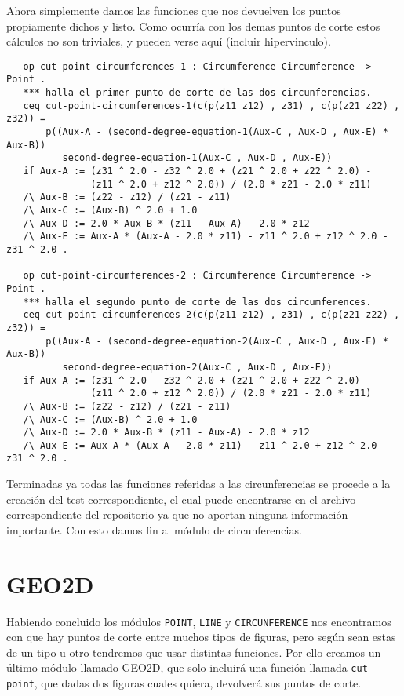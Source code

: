 Ahora simplemente damos las funciones que nos devuelven los puntos propiamente dichos y listo. Como ocurría con los demas puntos de corte estos cálculos no son triviales, y pueden verse aquí (incluir hipervinculo). 
{\codesize
\begin{verbatim}
   op cut-point-circumferences-1 : Circumference Circumference -> Point .
   *** halla el primer punto de corte de las dos circunferencias.
   ceq cut-point-circumferences-1(c(p(z11 z12) , z31) , c(p(z21 z22) , z32)) = 
       p((Aux-A - (second-degree-equation-1(Aux-C , Aux-D , Aux-E) * Aux-B))  
          second-degree-equation-1(Aux-C , Aux-D , Aux-E))
   if Aux-A := (z31 ^ 2.0 - z32 ^ 2.0 + (z21 ^ 2.0 + z22 ^ 2.0) - 
               (z11 ^ 2.0 + z12 ^ 2.0)) / (2.0 * z21 - 2.0 * z11) 
   /\ Aux-B := (z22 - z12) / (z21 - z11) 
   /\ Aux-C := (Aux-B) ^ 2.0 + 1.0
   /\ Aux-D := 2.0 * Aux-B * (z11 - Aux-A) - 2.0 * z12
   /\ Aux-E := Aux-A * (Aux-A - 2.0 * z11) - z11 ^ 2.0 + z12 ^ 2.0 - z31 ^ 2.0 .

   op cut-point-circumferences-2 : Circumference Circumference -> Point .
   *** halla el segundo punto de corte de las dos circumferences.
   ceq cut-point-circumferences-2(c(p(z11 z12) , z31) , c(p(z21 z22) , z32)) = 
       p((Aux-A - (second-degree-equation-2(Aux-C , Aux-D , Aux-E) * Aux-B))  
          second-degree-equation-2(Aux-C , Aux-D , Aux-E))
   if Aux-A := (z31 ^ 2.0 - z32 ^ 2.0 + (z21 ^ 2.0 + z22 ^ 2.0) -
               (z11 ^ 2.0 + z12 ^ 2.0)) / (2.0 * z21 - 2.0 * z11) 
   /\ Aux-B := (z22 - z12) / (z21 - z11) 
   /\ Aux-C := (Aux-B) ^ 2.0 + 1.0
   /\ Aux-D := 2.0 * Aux-B * (z11 - Aux-A) - 2.0 * z12
   /\ Aux-E := Aux-A * (Aux-A - 2.0 * z11) - z11 ^ 2.0 + z12 ^ 2.0 - z31 ^ 2.0 .
\end{verbatim}
}

Terminadas ya todas las funciones referidas a las circunferencias se procede a la creación del test correspondiente, el cual puede encontrarse en el archivo correspondiente del repositorio ya que no aportan ninguna información importante. Con esto damos fin al módulo de circunferencias.\par

\section{GEO2D}

Habiendo concluido los módulos \texttt{POINT}, \texttt{LINE} y \texttt{CIRCUNFERENCE} nos encontramos con que hay puntos de corte entre muchos tipos de figuras, pero según sean estas de un tipo u otro tendremos que usar distintas funciones. Por ello creamos un último módulo llamado GEO2D, que solo incluirá una función llamada \texttt{cut-point}, que dadas dos figuras cuales quiera, devolverá sus puntos de corte. \par

